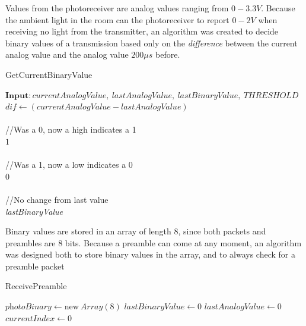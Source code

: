 \documentclass[letterpaper,10pt]{article}
\begin{document}
\begin{spacing}{1.15}
Values from the photoreceiver are analog values ranging from $0-3.3V$. Because the ambient light in the room can the photoreceiver to report $0-2V$ when receiving no light from the transmitter, an algorithm was created to decide binary values of a transmission based only on the \textit{difference} between the current analog value and the analog value $200 \mu s$ before.

\makeatletter
\def\BState{\State\hskip-\ALG@thistlm}
\makeatother

\begin{algorithm}[H]
	\caption{GetCurrentBinaryValue}\label{euclid}
	\begin{algorithmic}[1]
		\State $\textbf{Input}: \textit{currentAnalogValue},\ \textit{lastAnalogValue},\ \textit{lastBinaryValue},\ \textit{THRESHOLD}$\\
		
		\State $\textit{dif} \gets (\textit{currentAnalogValue} - \textit{lastAnalogValue})$\\\\
		
		
		//Was a 0, now a high indicates a 1
		 \\
		\quad \Return $1$\\\\

		//Was a 1, now a low indicates a 0
		 \\
		\quad \Return $0$\\\\
		
		//No change from last value
		\Else\\
		\quad \Return \textit{lastBinaryValue}
		\EndIf
	\end{algorithmic}
\end{algorithm}

Binary values are stored in an array of length 8, since both packets and preambles are 8 bits. Because a preamble can come at any moment, an algorithm was designed both to store binary values in the array, and to always check for a preamble packet 

\begin{algorithm}[H]
	\caption{ReceivePreamble}\label{euclid}
	\begin{algorithmic}[1]
		\State $\textit{photoBinary} \gets \text{new}\ \textit{Array}(8)$
		\State $\textit{lastBinaryValue} \gets 0$
		\State $\textit{lastAnalogValue} \gets 0$
		\State $currentIndex \gets 0$\\
		

\end{algorithmic}
\end{algorithm}
\end{spacing}
\end{document}
